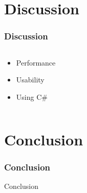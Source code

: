 \section{Discussion}
\begin{frame}
  \frametitle{Discussion}


\begin{columns}
\begin{column}{0.5\textwidth}
\begin{itemize}
\item<1->Performance
\item<2->Usability
\item<3->Using C\#
\end{itemize}
\end{column}

\begin{column}{0.5\textwidth}
\end{column}
\end{columns}





\end{frame}

\section{Conclusion}
\begin{frame}
  \frametitle{Conclusion}

\centering
Conclusion

\end{frame}

